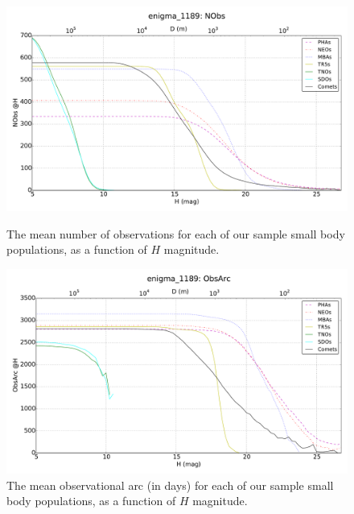 \documentclass{iau}
\begin{document}
\begin{figure}[tb]
\begin{minipage}{.5\textwidth}
\begin{center}
\includegraphics[width=0.9\linewidth]{nobs}
\captionsetup{width=0.9\linewidth}
\caption{The mean number of observations for each of our sample small
  body populations, as a function of $H$ magnitude.
\label{nobs}}
\end{center}
\end{minipage}
\begin{minipage}{.5\textwidth}
\begin{center}
\includegraphics[width=0.9\linewidth]{arclength}
\captionsetup{width=0.9\linewidth}
\caption{The mean observational arc (in days) for each of our sample
  small body populations, as a function of $H$ magnitude.
\label{arclength}}
\end{center}
\end{minipage}
\end{figure}
\end{document}
